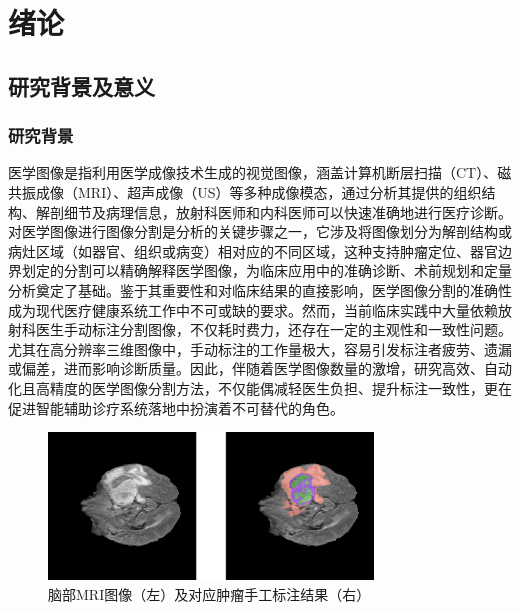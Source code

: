 \section{绪论}

\subsection{研究背景及意义}
\subsubsection{研究背景}

医学图像是指利用医学成像技术生成的视觉图像，涵盖计算机断层扫描（CT）、磁共振成像（MRI）、超声成像（US）等多种成像模态，通过分析其提供的组织结构、解剖细节及病理信息，放射科医师和内科医师可以快速准确地进行医疗诊断。对医学图像进行图像分割是分析的关键步骤之一，它涉及将图像划分为解剖结构或病灶区域（如器官、组织或病变）相对应的不同区域，这种支持肿瘤定位、器官边界划定的分割可以精确解释医学图像，为临床应用中的准确诊断、术前规划和定量分析奠定了基础\cite{panayides2020}。鉴于其重要性和对临床结果的直接影响，医学图像分割的准确性成为现代医疗健康系统工作中不可或缺的要求。然而，当前临床实践中大量依赖放射科医生手动标注分割图像，不仅耗时费力，还存在一定的主观性和一致性问题。尤其在高分辨率三维图像中，手动标注的工作量极大，容易引发标注者疲劳、遗漏或偏差，进而影响诊断质量。因此，伴随着医学图像数量的激增，研究高效、自动化且高精度的医学图像分割方法，不仅能偶减轻医生负担、提升标注一致性，更在促进智能辅助诊疗系统落地中扮演着不可替代的角色。

\begin{figure}[h]
    \centering
    \includegraphics[width=0.77\textwidth]{fig/flair_and_mask.png}
    \caption{脑部MRI图像（左）及对应肿瘤手工标注结果（右）}
    \label{brian_tumor}
\end{figure}

